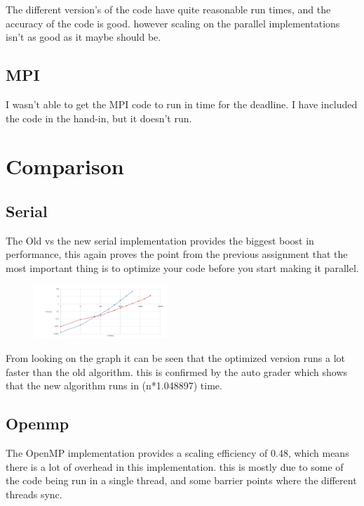 \documentclass[a4paper,10pt,titlepage]{report}
\begin{document}
The different version's of the code have quite reasonable run times, and the accuracy of the code is good. however scaling on the parallel implementations isn't as good as it maybe should be.  \\

\subsection{MPI}
I wasn't able to get the MPI code to run in time for the deadline. I have included the code in the hand-in, but it doesn't run.

\section{Comparison}

\subsection{Serial}
The Old vs the new serial implementation provides the biggest boost in performance, this again proves the point from the previous assignment that the most important thing is to optimize your code before you start making it parallel. \\
\begin{figure} %
    \centering
    \includegraphics[width=0.45\textwidth]{oldvsnew}
\end{figure}

From looking on the graph it can be seen that the optimized version runs a lot faster than the old algorithm. this is confirmed by the auto grader which shows that the new algorithm runs in (n*1.048897) time.


\subsection{Openmp}
The OpenMP implementation provides a scaling efficiency of 0.48, which means there is a lot of overhead in this implementation. this is mostly due to some of the code being run in a single thread, and some barrier points where the different threads sync.
\end{document}
